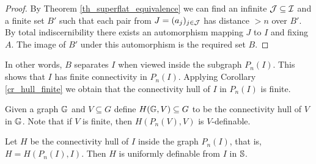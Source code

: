 \begin{proof}
  By Theorem \ref{th_superflat_equivalence} we can find an infinite $\operatorname{\mathcal J} \subseteq \operatorname{\mathcal I}$ and a finite set $B'$
  such that each pair from $J = (a_j)_{j \in \operatorname{\mathcal J}}$ has distance $>n$ over $B'$.
  By total indiscernibility there exists an automorphism mapping $J$ to $I$ and fixing $A$.
  The image of $B'$ under this automorphism is the required set $B$.
\end{proof}

In other words, $B$ separates $I$ when viewed inside the subgraph $P_n(I)$.
This shows that $I$ has finite connectivity in $P_n(I)$.
Applying Corollary \ref{cr_hull_finite} we obtain that the connectivity hull of $I$ in $P_n(I)$ is finite.


\begin{Definition}
  Given a graph $\mathbb G$ and $V \subseteq G$ define $H(\mathbb G, V) \subseteq G$ to be the connectivity hull of $V$ in $\mathbb G$.
  Note that if $V$ is finite, then $H(P_n(V), V)$ is $V$-definable.
\end{Definition}

\begin{Lemma} \label{lm_uniform}
  Let $H$ be the connectivity hull of $I$ inside the graph $P_n(I)$, that is, $H = H(P_n(I), I)$.
  Then $H$ is uniformly definable from $I$ in $\mathbb S$.
\end{Lemma}

